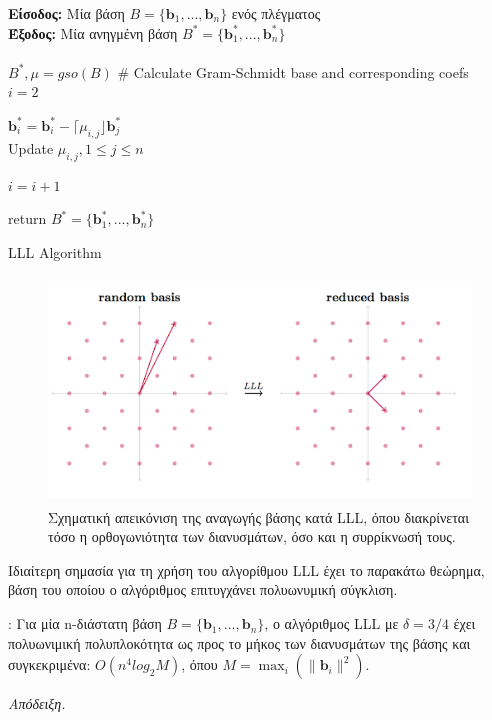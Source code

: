 \begin{algorithm}[h] \label{LLL}
\SetAlgoLined

{\bf Είσοδος:} Μία βάση $ B = \{\bm b_1, ..., \bm b_n \} $ ενός πλέγματος \\
{\bf Έξοδος:} Μία ανηγμένη βάση $ B^* = \{\bm b_1^*, ..., \bm b_n^* \} $ \\

\hfill \\

$ B^*, μ = gso(B) $ \# Calculate Gram-Schmidt base and corresponding coefs \\
$ i = 2 $ \\

 {
     {
    
      $ \bm b_i^* = \bm b_i^* - \lceil μ_{i,j} \rfloor \bm b_j^* $ \\
      Update $ μ_{i,j}, 1 \leq j \leq n $ \\
    } %
    
    {
    $ i = i + 1 $
    }
    
} %
return $ B^* = \{\bm b_1^*, ..., \bm b_n^* \} $


\caption{LLL Algorithm}
\end{algorithm}

\begin{figure}[!htbp]
\centering
\includegraphics[width=0.8\linewidth,height=6cm]{pictures/basis_reduction.png}
\caption{Σχηματική απεικόνιση της αναγωγής βάσης κατά LLL, όπου διακρίνεται τόσο η ορθογωνιότητα των διανυσμάτων, όσο και η συρρίκνωσή τους.}
\label{fig:LLL}       
\end{figure}

Ιδιαίτερη σημασία για τη χρήση του αλγορίθμου LLL έχει το παρακάτω θεώρημα, βάση του οποίου ο αλγόριθμος επιτυγχάνει πολυωνυμική σύγκλιση. 

\begin{theorem}: 
Για μία n-διάστατη βάση $B = \{\bm b_1, ..., \bm b_n \} $, ο αλγόριθμος LLL με $ \delta = 3/4 $ έχει πολυωνιμική πολυπλοκότητα ως προς το μήκος των διανυσμάτων της βάσης και συγκεκριμένα: $ O(n^4log_2Μ) $, όπου $ Μ = \max_i(\| \bm b_i\|^2)$.
\end{theorem}
\emph{Απόδειξη.} \cite{journals/siamcomp/NguyenS09}